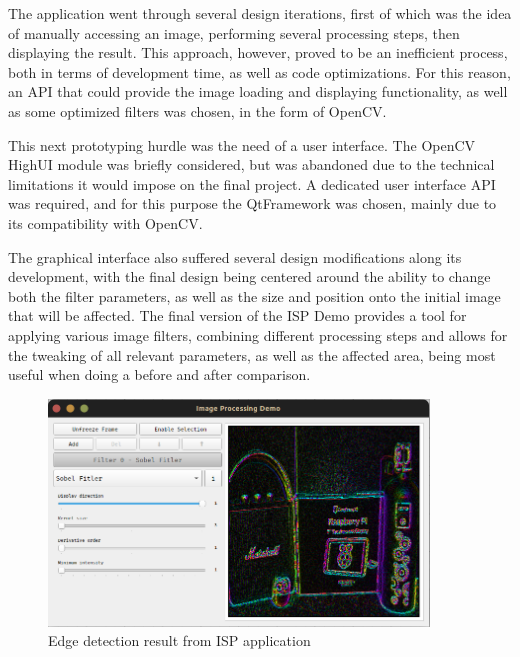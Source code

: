 The application went through several design iterations, first of which was the idea of manually accessing an
image, performing several processing steps, then displaying the result. This approach, however, proved to be an 
inefficient process, both in terms of development time, as well as code optimizations. For this reason, an API
that could provide the image loading and displaying functionality, as well as some optimized filters was chosen,
in the form of OpenCV.

This next prototyping hurdle was the need of a user interface. The OpenCV HighUI module was briefly considered,
but was abandoned due to the technical limitations it would impose on the final project. A dedicated user
interface API was required, and for this purpose the QtFramework was chosen, mainly due to its compatibility
with OpenCV.

The graphical interface also suffered several design modifications along its development, with the final design
being centered around the ability to change both the filter parameters, as well as the size and position onto
the initial image that will be affected. The final version of the ISP Demo provides a tool for applying various
image filters, combining different processing steps and allows for the tweaking of all relevant parameters, as
well as the affected area, being most useful when doing a before and after comparison.

\begin{figure}[H]
	\includegraphics[width=0.9\textwidth, height=0.6\textwidth]{resources/Sobel_5.png}
	\caption{Edge detection result from ISP application}
\end{figure}

